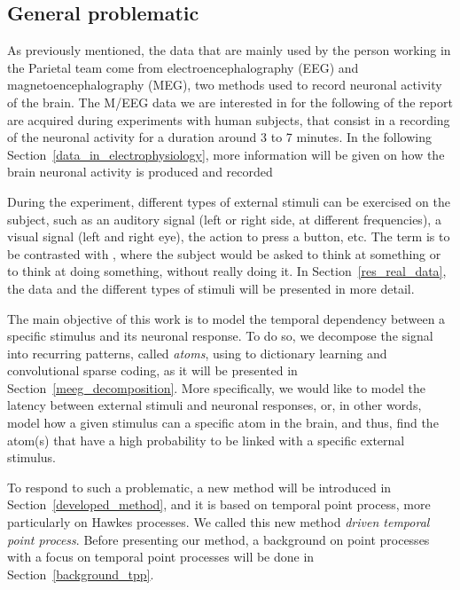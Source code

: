 \subsection{General problematic}

As previously mentioned, the data that are mainly used by the person working in the Parietal team come from electroencephalography (EEG) and magnetoencephalography (MEG), two methods used to record neuronal activity of the brain.
The M/EEG data we are interested in for the following of the report are acquired during experiments with human subjects, that consist in a recording of the neuronal activity for a duration around 3 to 7 minutes.
In the following Section~\ref{data_in_electrophysiology}, more information will be given on how the brain neuronal activity is produced and recorded

During the experiment, different types of external stimuli can be exercised on the subject, such as an auditory signal (left or right side, at different frequencies), a visual signal (left and right eye), the action to press a button, etc.
The term  is to be contrasted with , where the subject would be asked to think at something or to think at doing something, without really doing it.
In Section~\ref{res_real_data}, the data and the different types of stimuli will be presented in more detail.

The main objective of this work is to model the temporal dependency between a specific stimulus and its neuronal response.
To do so, we decompose the signal into recurring patterns, called \textit{atoms}, using to dictionary learning and convolutional sparse coding, as it will be presented in Section~\ref{meeg_decomposition}.
More specifically, we would like to model the latency between external stimuli and neuronal responses, or, in other words, model how a given stimulus can  a specific atom in the brain, and thus, find the atom(s) that have a high probability to be linked with a specific external stimulus.

To respond to such a problematic, a new method will be introduced in Section~\ref{developed_method}, and it is based on temporal point process, more particularly on Hawkes processes.
We called this new method \textit{driven temporal point process}.
Before presenting our method, a background on point processes with a focus on temporal point processes will  be done  in Section~\ref{background_tpp}.

 